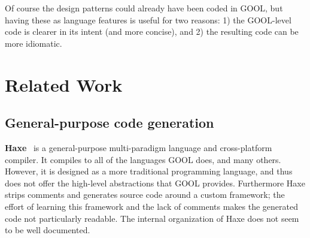 \documentclass[sigplan,review,prologue,dvipsnames]{acmart}
\begin{document}
Of course the design patterns could already have been coded in GOOL, but
having these as language features is useful for two reasons: 1) the GOOL-level
code is clearer in its intent (and more concise), and 2) the resulting code
can be more idiomatic.

\section{Related Work} \label{sec:related}

\subsection{General-purpose code generation}

\textbf{Haxe}~\cite{Haxe} is a general-purpose multi-paradigm language and cross-platform
compiler.  It compiles to all of the languages GOOL does, and many
others.  However, it is designed as a more traditional programming language, and
thus does not offer the high-level abstractions that GOOL provides. Furthermore
Haxe strips comments and generates source code around a custom framework; 
the effort of learning this framework and the lack of comments makes the generated
code not particularly readable. The internal organization of Haxe does not seem
to be well documented.
\end{document}
